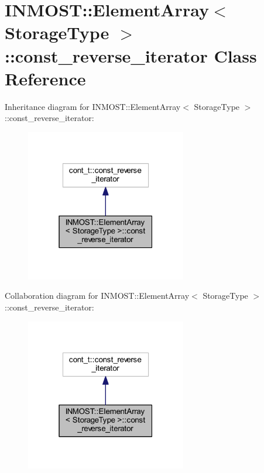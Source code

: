 \hypertarget{classINMOST_1_1ElementArray_1_1const__reverse__iterator}{\section{I\-N\-M\-O\-S\-T\-:\-:Element\-Array$<$ Storage\-Type $>$\-:\-:const\-\_\-reverse\-\_\-iterator Class Reference}
\label{classINMOST_1_1ElementArray_1_1const__reverse__iterator}
}


Inheritance diagram for I\-N\-M\-O\-S\-T\-:\-:Element\-Array$<$ Storage\-Type $>$\-:\-:const\-\_\-reverse\-\_\-iterator\-:\nopagebreak
\begin{figure}[H]
\begin{center}
\leavevmode
\includegraphics[width=199pt]{classINMOST_1_1ElementArray_1_1const__reverse__iterator__inherit__graph}
\end{center}
\end{figure}


Collaboration diagram for I\-N\-M\-O\-S\-T\-:\-:Element\-Array$<$ Storage\-Type $>$\-:\-:const\-\_\-reverse\-\_\-iterator\-:\nopagebreak
\begin{figure}[H]
\begin{center}
\leavevmode
\includegraphics[width=199pt]{classINMOST_1_1ElementArray_1_1const__reverse__iterator__coll__graph}
\end{center}
\end{figure}

